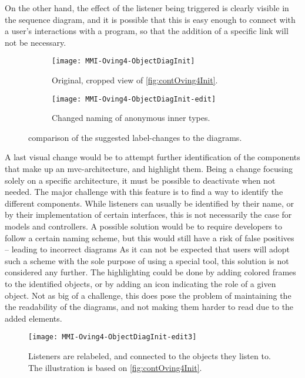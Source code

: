On the other hand, the effect of the listener being triggered is clearly visible in the sequence diagram, and it is possible that this is easy enough to connect with a user's interactions with a program, so that the addition of a specific link will not be necessary.

\begin{figure}[H]
	\centering
	\begin{subfigure}{\textwidth}
		\centering
		\texttt{[image: MMI-Oving4-ObjectDiagInit]}
		\caption{Original, cropped view of \cref{fig:contOving4Init}.}
		\label{fig:contOving4ChangesLabA}
	\end{subfigure}
	\begin{subfigure}{\textwidth}
		\centering
		\texttt{[image: MMI-Oving4-ObjectDiagInit-edit]}
		\caption{Changed naming of anonymous inner types.}
		\label{fig:contOving4ChangesLabB}
	\end{subfigure}
	\caption{comparison of the suggested label-changes to the diagrams.}
	\label{fig:contOving4ChangesLab}
\end{figure}

A last visual change would be to attempt further identification of the components that make up an \gls{mvc}-architecture, and highlight them.
Being a change focusing solely on a specific architecture, it must be possible to deactivate when not needed.
The major challenge with this feature is to find a way to identify the different components.
While listeners can usually be identified by their name, or by their implementation of certain interfaces, this is not necessarily the case for models and controllers.
A possible solution would be to require developers to follow a certain naming scheme, but this would still have a risk of false positives -- leading to incorrect diagrams
As it can not be expected that users will adopt such a scheme with the sole purpose of using a special tool, this solution is not considered any further.
The highlighting could be done by adding colored frames to the identified objects, or by adding an icon indicating the role of a given object.
Not as big of a challenge, this does pose the problem of maintaining the the readability of the diagrams, and not making them harder to read due to the added elements.


\begin{figure}[H]
	\centering
	\texttt{[image: MMI-Oving4-ObjectDiagInit-edit3]}
	\caption{Listeners are relabeled, and connected to the objects they listen to. The illustration is based on \cref{fig:contOving4Init}.}
	\label{fig:contOving4ChangesLink}
\end{figure}



